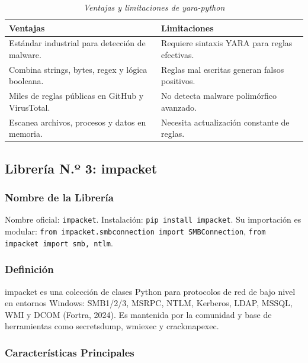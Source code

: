 \documentclass[12pt,a4paper]{article}
\begin{document}
\begin{table}[H]
\centering
\begin{threeparttable}
\caption{\textit{Ventajas y limitaciones de yara-python}}
\begin{tabular}{p{6.5cm}p{6.5cm}}
\toprule
\textbf{Ventajas} & \textbf{Limitaciones} \\
\midrule
Estándar industrial para detección de malware. & Requiere sintaxis YARA para reglas efectivas. \\
Combina strings, bytes, regex y lógica booleana. & Reglas mal escritas generan falsos positivos. \\
Miles de reglas públicas en GitHub y VirusTotal. & No detecta malware polimórfico avanzado. \\
Escanea archivos, procesos y datos en memoria. & Necesita actualización constante de reglas. \\
\bottomrule
\end{tabular}
\end{threeparttable}
\end{table}

\subsection{Librería N.º 3: impacket}

\subsubsection{Nombre de la Librería}

Nombre oficial: \texttt{impacket}. Instalación: \texttt{pip install impacket}.
Su importación es modular: \texttt{from impacket.smbconnection import
SMBConnection}, \texttt{from impacket import smb, ntlm}.

\subsubsection{Definición}

impacket es una colección de clases Python para protocolos de red de
bajo nivel en entornos Windows: SMB1/2/3, MSRPC, NTLM, Kerberos, LDAP,
MSSQL, WMI y DCOM (Fortra, 2024). Es mantenida por la comunidad y base
de herramientas como secretsdump, wmiexec y crackmapexec.

\subsubsection{Características Principales}
\end{document}
